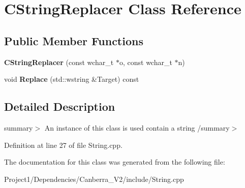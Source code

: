 \hypertarget{class_c_string_replacer}{}\section{C\+String\+Replacer Class Reference}
\label{class_c_string_replacer}
\subsection*{Public Member Functions}
\begin{DoxyCompactItemize}
\item 
\mbox{\label{class_c_string_replacer_a72defe069846ae78f4026b6899de83d0}} 
{\bfseries C\+String\+Replacer} (const wchar\+\_\+t $\ast$o, const wchar\+\_\+t $\ast$n)
\item 
\mbox{\label{class_c_string_replacer_a2f5d64bb68b0ebd3cf395d7130f8dbde}} 
void {\bfseries Replace} (std\+::wstring \&Target) const
\end{DoxyCompactItemize}


\subsection{Detailed Description}
summary$>$ An instance of this class is used contain a string /summary$>$ 

Definition at line 27 of file String.\+cpp.



The documentation for this class was generated from the following file\+:\begin{DoxyCompactItemize}
\item 
Project1/\+Dependencies/\+Canberra\+\_\+\+V2/include/String.\+cpp\end{DoxyCompactItemize}
